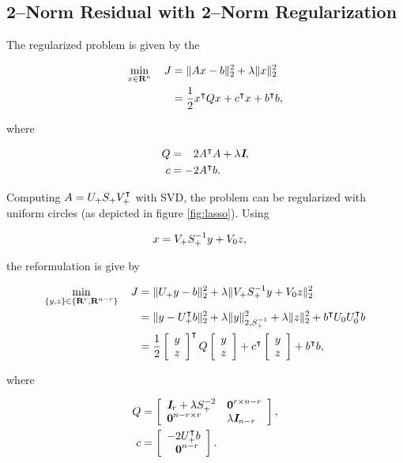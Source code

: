 \documentclass{article}
\begin{document}
\subsection{2--Norm Residual with 2--Norm Regularization}

    The regularized problem is given by the \QP

    \begin{align*}
        \min_{x\in\textbf{R}^n}\quad J
        &=
        \|Ax-b\|_2^2+\lambda\| x\|_2^2\\
        &=\frac{1}{2} x^\intercal Q x + c^\intercal x +b^\intercal b,
    \end{align*}

    where

    \begin{align*}
        Q
        &=
            \minus 2A^\tp A+\lambda\eye,
        \\
            c
        &=
            -2A^\tp b.
    \end{align*}

    Computing $A=U_+S_+V_+^\intercal$ with SVD, 
    the problem can be regularized with uniform circles 
    (as depicted in figure \ref{fig:lasso}). Using

    \begin{align*}
        x&=V_+ S_+^{-1} y+V_0 z,
    \end{align*}

    the reformulation is give by

    \begin{align*}
        \min_{\{y,z\}\in\{\textbf{R}^r,\textbf{R}^{n-r}\}}\quad J &= \|U_+ y -  b\|_2^2 + \lambda\|V_+ S_+^{-1} y+V_0 z\|_2^2\\
        &= \|y-U_+^\intercal b\|_2^2 + \lambda\|y\|_{2,S_+^{-1}}^2+\lambda \|z\|_2^2 + b^\intercal U_0U_0^\intercal b\\
        &=\frac{1}{2} \left[\begin{array}{lllllllllllllllllll}y\\z\end{array}\right]^\intercal Q \left[\begin{array}{lllllllllllllllllll}y\\z\end{array}\right] + c^\intercal \left[\begin{array}{lllllllllllllllllll}y\\z\end{array}\right] +b^\intercal b,
    \end{align*}

    where

    \begin{align*}
        Q
        &=
            \mat{\eye_r+\lambda S_+^{-2} & \zeros^{r\times {n-r}} \\
            \zeros^{n-r\times r} & \lambda\eye_{n-r} },
        \\
            c
        &=  \mat{
            -2\lrs^\tp b\\
            \minus \zeros^{n-r}
            }.
    \end{align*}
\end{document}
